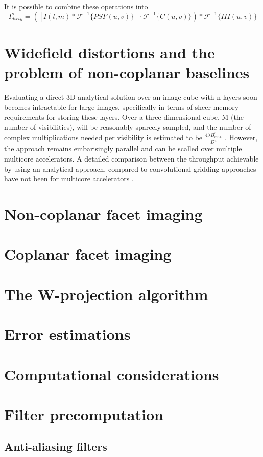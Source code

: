  It is possible to combine these operations into 
 \begin{equation*}
  I^s_{dirty} = ([I(l,m)*\mathcal{F}^{-1}\{PSF(u,v)\}]\cdot\mathcal{F}^{-1}\{C(u,v)\}) * \mathcal{F}^{-1}\{III(u,v)\}
 \end{equation*}
\section{Widefield distortions and the problem of non-coplanar baselines}
Evaluating a direct 3D analytical solution over an image cube with n layers soon becomes intractable for large images, specifically in terms of sheer memory requirements for storing these layers. Over a three dimensional cube, M (the number of visibilities),
will be reasonably sparcely sampled, and the number of complex multiplications needed per visibility is estimated to be $\frac{4\lambda B_{max}^3}{D^4}$ \cite{yashar2009tdp}. However, the approach remains embarisingly parallel and can
be scalled over multiple multicore accelerators. A detailed comparison between the throughput achievable by using an analytical approach, compared to convolutional gridding approaches have not been for multicore accelerators \cite{hardy2013direct}.
\section{Non-coplanar facet imaging}
\section{Coplanar facet imaging}
\section{The W-projection algorithm}
\section{Error estimations}
\section{Computational considerations}
\section{Filter precomputation}
\subsection{Anti-aliasing filters}
